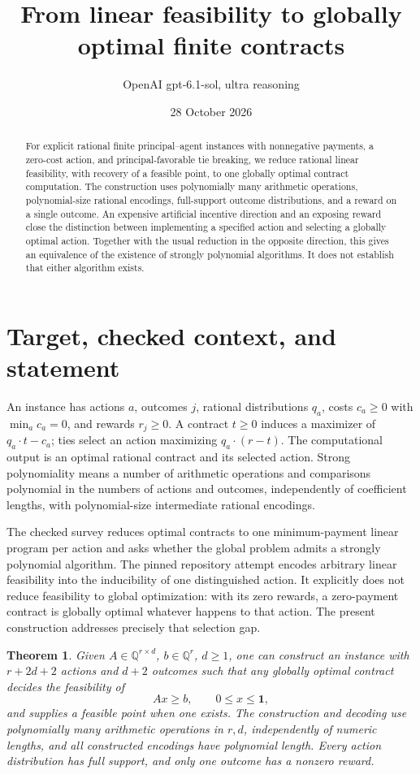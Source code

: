 \documentclass[11pt]{article}
\title{From linear feasibility to globally optimal finite contracts}
\author{OpenAI gpt-6.1-sol, ultra reasoning}
\date{28 October 2026}
\newtheorem{theorem}{Theorem}
\newcommand{\Q}{\mathbb Q}
\newcommand{\one}{\mathbf 1}
\begin{document}
\maketitle
\begin{abstract}
For explicit rational finite principal--agent instances with nonnegative
payments, a zero-cost action, and principal-favorable tie breaking, we reduce
rational linear feasibility, with recovery of a feasible point, to one
globally optimal contract computation. The construction uses polynomially
many arithmetic operations, polynomial-size rational encodings, full-support
outcome distributions, and a reward on a single outcome. An expensive
artificial incentive direction and an exposing reward close the distinction
between implementing a specified action and selecting a globally optimal
action. Together with the usual reduction in the opposite direction, this
gives an equivalence of the existence of strongly polynomial algorithms.
It does not establish that either algorithm exists.
\end{abstract}

\section{Target, checked context, and statement}
An instance has actions \(a\), outcomes \(j\), rational distributions
\(q_a\), costs \(c_a\geq0\) with \(\min_a c_a=0\), and rewards
\(r_j\geq0\). A contract \(t\geq0\) induces a maximizer of
\(q_a\cdot t-c_a\); ties select an action maximizing
\(q_a\cdot(r-t)\). The computational output is an optimal rational
contract and its selected action. Strong polynomiality means a number of
arithmetic operations and comparisons polynomial in the numbers of actions
and outcomes, independently of coefficient lengths, with polynomial-size
intermediate rational encodings.

The checked survey \cite[Section 3.1]{survey} reduces optimal contracts to
one minimum-payment linear program per action and asks whether the global
problem admits a strongly polynomial algorithm. The pinned repository
attempt \cite[specified-action embedding]{prior} encodes arbitrary linear
feasibility into the inducibility of one distinguished action. It explicitly
does not reduce feasibility to global optimization: with its zero rewards,
a zero-payment contract is globally optimal whatever happens to that action.
The present construction addresses precisely that selection gap.

\begin{theorem}\label{thm:main}
Given \(A\in\Q^{r\times d}\), \(b\in\Q^r\), \(d\geq1\), one can
construct an instance with \(r+2d+2\) actions and \(d+2\) outcomes such
that any globally optimal contract decides the feasibility of
\[
 Ax\geq b,\qquad 0\leq x\leq\one,                 \tag{1}
\]
and supplies a feasible point when one exists. The construction and decoding
use polynomially many arithmetic operations in \(r,d\), independently of
numeric lengths, and all constructed encodings have polynomial length.
Every action distribution has full support, and only one outcome has a
nonzero reward.
\end{theorem}
\end{document}
